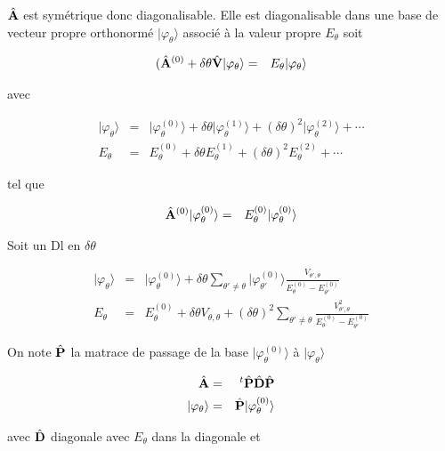 $\hat{\mathbf{A}}$  est symétrique donc diagonalisable. Elle est diagonalisable dans une base de vecteur propre orthonormé $\vert \varphi_\theta \rangle $ associé à la valeur propre $E_\theta$ soit 

\begin{eqnarray*}
	(\hat{\mathbf{A}}^{(0)} + \delta \theta \hat{\mathbf{V}} \vert \varphi_\theta \rangle & = & 	E_\theta \vert \varphi_\theta \rangle	
\end{eqnarray*}

avec 

\begin{eqnarray*}
	\vert \varphi_\theta \rangle  & = & \vert \varphi_\theta^{(0)} \rangle  + \delta \theta  \vert \varphi_\theta^{(1)}	\rangle  + 	(\delta \theta)^2 \vert \varphi_\theta^{(2)}	\rangle  + \cdots \\
	E_\theta & = & E_\theta^{(0)}   + \delta \theta E_\theta^{(1)}  + 	(\delta \theta)^2 E_\theta^{(2)} + \cdots 	
\end{eqnarray*}

tel que 

\begin{eqnarray*}
	\hat{\mathbf{A}}^{(0)} \vert \varphi_\theta^{(0)} \rangle & = & E_\theta^{(0)}	 \vert \varphi_\theta^{(0)} \rangle 	
\end{eqnarray*}

Soit un Dl en $\delta \theta $ 

\begin{eqnarray*}
	\vert \varphi_\theta \rangle & = & \vert \varphi_\theta^{(0)} \rangle + \delta \theta \sum_{\theta' \neq \theta } \vert \varphi_{\theta'}^{(0)} \rangle   \frac{ V_{\theta', \theta}}{ E_\theta^{(0)} - E_{\theta'}^{(0)} } \\
	E_\theta & = & E_\theta^{(0)} + \delta \theta V_{\theta , \theta} + (\delta \theta)^2 \sum_{\theta' \neq \theta } \frac{ V_{\theta', \theta}^2}{ E_\theta^{(0)} - E_{\theta'}^{(0)} }
\end{eqnarray*}

On note $\hat{\mathbf{P}}$ la matrace de passage de la base $\vert \varphi_\theta^{(0)} \rangle $ à $\vert \varphi_\theta \rangle $


\begin{eqnarray*}
	\hat{\mathbf{A}} & = & {~}^t\hat{\mathbf{P}}\hat{\mathbf{D}}\hat{\mathbf{P}}	\\
	\vert \varphi_\theta \rangle & = & 	\hat{\mathbf{P}}\vert \varphi_\theta^{(0)} \rangle
\end{eqnarray*}

avec $\hat{\mathbf{D}}$ diagonale avec $E_\theta$ dans la diagonale et 

